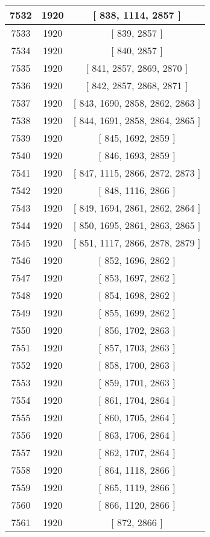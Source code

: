 \begin{center}
\begin{longtable}[H]{|| c c c ||}
\hline
7532 & 1920 & [ 838, 1114, 2857 ] \\ 
\hline
7533 & 1920 & [ 839, 2857 ] \\ 
\hline
7534 & 1920 & [ 840, 2857 ] \\ 
\hline
7535 & 1920 & [ 841, 2857, 2869, 2870 ] \\ 
\hline
7536 & 1920 & [ 842, 2857, 2868, 2871 ] \\ 
\hline
7537 & 1920 & [ 843, 1690, 2858, 2862, 2863 ] \\ 
\hline
7538 & 1920 & [ 844, 1691, 2858, 2864, 2865 ] \\ 
\hline
7539 & 1920 & [ 845, 1692, 2859 ] \\ 
\hline
7540 & 1920 & [ 846, 1693, 2859 ] \\ 
\hline
7541 & 1920 & [ 847, 1115, 2866, 2872, 2873 ] \\ 
\hline
7542 & 1920 & [ 848, 1116, 2866 ] \\ 
\hline
7543 & 1920 & [ 849, 1694, 2861, 2862, 2864 ] \\ 
\hline
7544 & 1920 & [ 850, 1695, 2861, 2863, 2865 ] \\ 
\hline
7545 & 1920 & [ 851, 1117, 2866, 2878, 2879 ] \\ 
\hline
7546 & 1920 & [ 852, 1696, 2862 ] \\ 
\hline
7547 & 1920 & [ 853, 1697, 2862 ] \\ 
\hline
7548 & 1920 & [ 854, 1698, 2862 ] \\ 
\hline
7549 & 1920 & [ 855, 1699, 2862 ] \\ 
\hline
7550 & 1920 & [ 856, 1702, 2863 ] \\ 
\hline
7551 & 1920 & [ 857, 1703, 2863 ] \\ 
\hline
7552 & 1920 & [ 858, 1700, 2863 ] \\ 
\hline
7553 & 1920 & [ 859, 1701, 2863 ] \\ 
\hline
7554 & 1920 & [ 861, 1704, 2864 ] \\ 
\hline
7555 & 1920 & [ 860, 1705, 2864 ] \\ 
\hline
7556 & 1920 & [ 863, 1706, 2864 ] \\ 
\hline
7557 & 1920 & [ 862, 1707, 2864 ] \\ 
\hline
7558 & 1920 & [ 864, 1118, 2866 ] \\ 
\hline
7559 & 1920 & [ 865, 1119, 2866 ] \\ 
\hline
7560 & 1920 & [ 866, 1120, 2866 ] \\ 
\hline
7561 & 1920 & [ 872, 2866 ] \\ 

\end{longtable}
\end{center}
